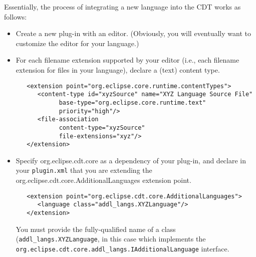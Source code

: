 Essentially, the process of integrating a new language into the CDT works
as follows:
\begin{itemize}

\item Create a new plug-in with an editor.  (Obviously, you will eventually
want to customize the editor for your language.)

\item For each filename extension supported by your editor (i.e., each
filename extension for files in your language), declare a (text) content type.
\begin{verbatim}
   <extension point="org.eclipse.core.runtime.contentTypes">
      <content-type id="xyzSource" name="XYZ Language Source File"
            base-type="org.eclipse.core.runtime.text"
            priority="high"/>
      <file-association
            content-type="xyzSource"
            file-extensions="xyz"/>
   </extension>
\end{verbatim}

\item Specify org.eclipse.cdt.core as a dependency of your plug-in, and
declare in your \texttt{plugin.xml} that you are extending the
org.eclipse.cdt.core.AdditionalLanguages extension point.
\begin{verbatim}
   <extension point="org.eclipse.cdt.core.AdditionalLanguages">
      <language class="addl_langs.XYZLanguage"/>
   </extension>
\end{verbatim}
You must provide the fully-qualified name of a class
(\texttt{addl\_langs.XYZLanguage}, in this case which implements the
\texttt{org.eclipse.cdt.core.addl\_langs.IAdditionalLanguage} interface.


\end{itemize}
